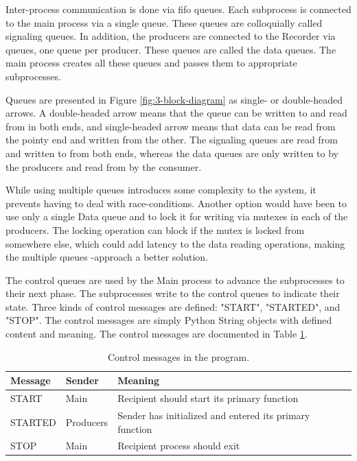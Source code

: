 Inter-process communication is done via \gls{fifo} queues.
Each subprocess is connected to the main process via a single queue.
These queues are colloquially called signaling queues.
In addition, the producers are connected to the Recorder via queues,
one queue per producer. These queues are called the data queues.
The main process creates all these queues and passes them to appropriate subprocesses.

Queues are presented in Figure \ref{fig:3-block-diagram} as single- or double-headed arrows.
A double-headed arrow means that the queue can be written to and read from in both ends,
and single-headed arrow means that data can be read from the pointy end and written from the other.
The signaling queues are read from and written to from both ends,
whereas the data queues are only written to by the producers and read from by the consumer.

While using multiple queues introduces some complexity to the system,
it prevents having to deal with race-conditions.
Another option would have been to use only a single Data queue
and to lock it for writing via mutexes in each of the producers.
The locking operation can block if the mutex is locked from somewhere else,
which could add latency to the data reading operations,
making the multiple queues -approach a better solution.

The control queues are used by the Main process to advance the subprocesses to their next phase.
The subprocesses write to the control queues to indicate their state.
Three kinds of control messages are defined: "START", "STARTED", and "STOP".
The control messages are simply Python String objects with defined content and meaning.
The control messages are documented in Table \ref{tab:control-messages}.

\begin{table}[H]
    \centering
    \begin{tabular}{l l l}
        \toprule
        \textbf{Message} & \textbf{Sender} & \textbf{Meaning} \\
        \midrule
        START & Main & Recipient should start its primary function \\
        STARTED & Producers & Sender has initialized and entered its primary function \\
        STOP & Main & Recipient process should exit \\
        \bottomrule
    \end{tabular}
    \caption{Control messages in the program.}
    \label{tab:control-messages}
\end{table}

